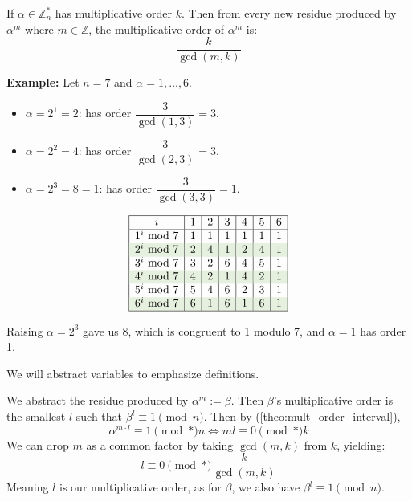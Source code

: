     \begin{theo}
            
        If $\alpha \in \mathbb{Z}_n^*$ has multiplicative order $k$. Then from every new residue produced by
         $\alpha^m$ where $m \in \mathbb{Z}$, the multiplicative order of $\alpha^m$ is:
        \[\dfrac{k}{\gcd(m, k)}\]
    \end{theo}
    \textbf{Example:} Let $n=7$ and $\alpha=1,\dots,6$.\\
    \begin{minipage}{0.6\textwidth}
        \noindent
        \begin{itemize}
            \item $\alpha=2^1=2$: has order $\dfrac{3}{\gcd(1,3)}=3$.
            \item $\alpha=2^2=4$: has order $\dfrac{3}{\gcd(2,3)}=3$.
            \item $\alpha=2^3=8=1$: has order $\dfrac{3}{\gcd(3,3)}=1$.
        \end{itemize}
        \end{minipage}
    \begin{minipage}{0.4\textwidth}
        \[
        \begin{array}{|c|c|c|c|c|c|c|}
        \hline
        i & 1 & 2 & 3 & 4 & 5 & 6 \\
        \hline
        1^i \text{ mod } 7 & 1 & 1 & 1 & 1 & 1 & 1 \\
        \rowcolor{OliveGreen!10}2^i \text{ mod } 7 & 2 & 4 & 1 & 2 & 4 & 1 \\
        3^i \text{ mod } 7 & 3 & 2 & 6 & 4 & 5 & 1 \\
        \rowcolor{OliveGreen!10}4^i \text{ mod } 7 & 4 & 2 & 1 & 4 & 2 & 1 \\
        5^i \text{ mod } 7 & 5 & 4 & 6 & 2 & 3 & 1 \\
        \rowcolor{OliveGreen!10}6^i \text{ mod } 7 & 6 & 1 & 6 & 1 & 6 & 1 \\
        \hline
        \end{array}
        \]
        \end{minipage}

        \vspace{1em}
        \noindent
        Raising $\alpha=2^3$ gave us 8, which is congruent to 1 modulo 7, and $\alpha=1$ has order 1.

        \noindent
        We will abstract variables to emphasize definitions.
        \begin{Proof}
            We abstract the residue produced by $\alpha^m:=\beta$. Then $\beta$'s multiplicative order is the smallest $l$ such that $\beta^l\equiv 1\pmod{n}$.
            Then by (\ref{theo:mult_order_interval}),
        \[\alpha^{m\cdot l}\equiv 1\pmod*{n}\Longleftrightarrow ml\equiv 0\pmod*{k}\]
        We can drop $m$ as a common factor by taking $\gcd(m,k)$ from $k$, yielding:
        \[l\equiv 0\pmod*{\dfrac{k}{\gcd(m,k)}}\]
        \noindent
        Meaning $l$ is our multiplicative order, as for $\beta$, we also have $\beta^l\equiv 1\pmod{n}$.

        \end{Proof}
    